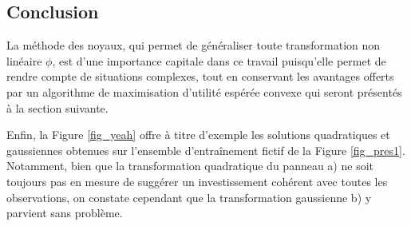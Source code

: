 \subsection{Conclusion}

La méthode des noyaux, qui permet de généraliser toute transformation non linéaire $\phi$,
est d'une importance capitale dans ce travail puisqu'elle permet de rendre compte de
situations complexes, tout en conservant les avantages offerts par un algorithme de
maximisation d'utilité espérée convexe qui seront présentés à la section suivante. 

Enfin, la Figure \ref{fig_yeah} offre à titre d'exemple les solutions quadratiques et
gaussiennes obtenues sur l'ensemble d'entraînement fictif de la Figure
\ref{fig_pres1}. Notamment, bien que la transformation quadratique du panneau a) ne soit
toujours pas en mesure de suggérer un investissement cohérent avec toutes les
observations, on constate cependant que la transformation gaussienne b) y parvient sans
problème.

